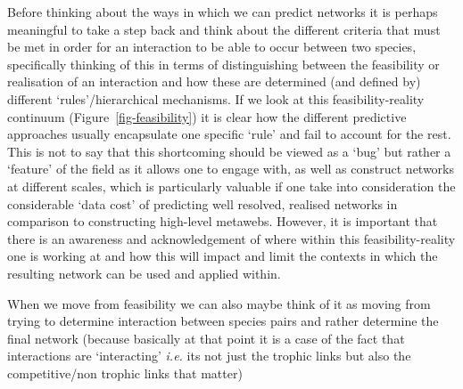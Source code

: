 \documentclass[
]{article}
\begin{document}
\begin{tcolorbox}[enhanced jigsaw, colback=white, coltitle=black, titlerule=0mm, opacitybacktitle=0.6, bottomrule=.15mm, left=2mm, arc=.35mm, breakable, rightrule=.15mm, bottomtitle=1mm, title=\textcolor{quarto-callout-note-color}{\faInfo}\hspace{0.5em}{Box 1 - Moving between the feasibility and reality of interactions}, leftrule=.75mm, colbacktitle=quarto-callout-note-color!10!white, toptitle=1mm, toprule=.15mm, opacityback=0, colframe=quarto-callout-note-color-frame]

Before thinking about the ways in which we can predict networks it is
perhaps meaningful to take a step back and think about the different
criteria that must be met in order for an interaction to be able to
occur between two species, specifically thinking of this in terms of
distinguishing between the feasibility or realisation of an interaction
and how these are determined (and defined by) different
`rules'/hierarchical mechanisms. If we look at this feasibility-reality
continuum (Figure~\ref{fig-feasibility}) it is clear how the different
predictive approaches usually encapsulate one specific `rule' and fail
to account for the rest. This is not to say that this shortcoming should
be viewed as a `bug' but rather a `feature' of the field as it allows
one to engage with, as well as construct networks at different scales,
which is particularly valuable if one take into consideration the
considerable `data cost' of predicting well resolved, realised networks
in comparison to constructing high-level metawebs. However, it is
important that there is an awareness and acknowledgement of where within
this feasibility-reality one is working at and how this will impact and
limit the contexts in which the resulting network can be used and
applied within.

When we move from feasibility we can also maybe think of it as moving
from trying to determine interaction between species pairs and rather
determine the final network (because basically at that point it is a
case of the fact that interactions are `interacting' \emph{i.e.} its not
just the trophic links but also the competitive/non trophic links that
matter)

\begin{figure}[H]

\centering{

}
\end{figure}
\end{tcolorbox}
\end{document}
